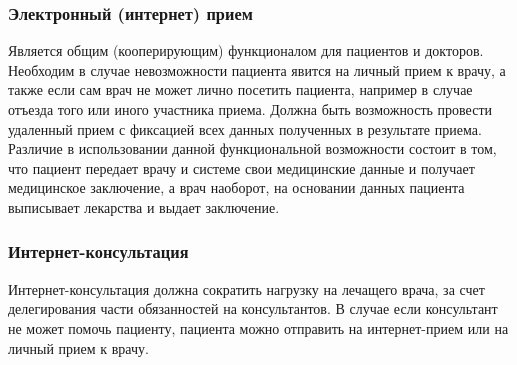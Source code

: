 \subsubsection{Электронный (интернет) прием}
Является общим (кооперирующим) функционалом для пациентов и докторов. Необходим
в случае невозможности пациента явится на личный прием к врачу, а также если сам
врач не может лично посетить пациента, например в случае отъезда того или иного
участника приема. Должна быть возможность провести удаленный прием с фиксацией
всех данных полученных в результате приема. Различие в использовании данной
функциональной возможности состоит в том, что пациент передает врачу и системе
свои медицинские данные и получает медицинское заключение, а врач наоборот, на
основании данных пациента выписывает лекарства и выдает заключение.

\subsubsection{Интернет-консультация}
Интернет-консультация должна сократить нагрузку на лечащего врача, за счет
делегирования части обязанностей на консультантов. В случае если консультант не
может помочь пациенту, пациента можно отправить на интернет-прием или на личный
прием к врачу.
